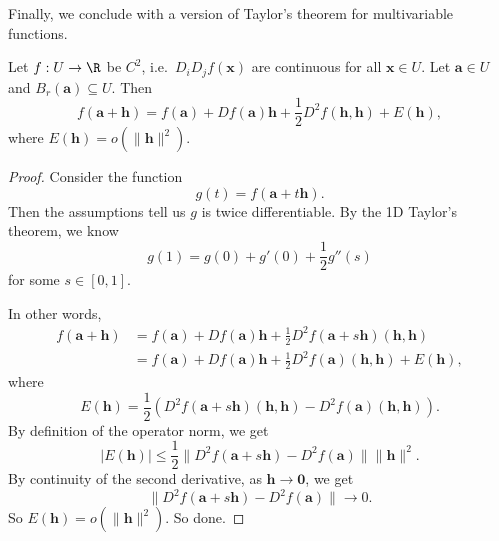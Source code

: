 \documentclass[a4paper]{article}
\begin{document}
Finally, we conclude with a version of Taylor's theorem for multivariable functions.

\begin{thm}
  Let $f: U \to \R$ be $C^2$, i.e.\ $D_i D_j f(\mathbf{x})$ are continuous for all $\mathbf{x} \in U$. Let $\mathbf{a} \in U$ and $B_r(\mathbf{a}) \subseteq U$. Then
  \[
    f(\mathbf{a} + \mathbf{h}) = f(\mathbf{a}) + D f(\mathbf{a})\mathbf{h} + \frac{1}{2} D^2 f(\mathbf{h}, \mathbf{h}) + E(\mathbf{h}),
  \]
  where $E(\mathbf{h}) = o(\|\mathbf{h}\|^2)$.
\end{thm}

\begin{proof}
  Consider the function
  \[
    g(t) = f(\mathbf{a} + t\mathbf{h}).
  \]
  Then the assumptions tell us $g$ is twice differentiable. By the 1D Taylor's theorem, we know
  \[
    g(1) = g(0) + g'(0) + \frac{1}{2} g''(s)
  \]
  for some $s \in [0, 1]$.

  In other words,
  \begin{align*}
    f(\mathbf{a} + \mathbf{h}) &= f(\mathbf{a}) + Df(\mathbf{a}) \mathbf{h} + \frac{1}{2} D^2 f(\mathbf{a} + s \mathbf{h}) (\mathbf{h}, \mathbf{h})\\
    &= f(\mathbf{a}) + Df(\mathbf{a}) \mathbf{h} + \frac{1}{2} D^2 f(\mathbf{a}) (\mathbf{h}, \mathbf{h}) + E(\mathbf{h}),
  \end{align*}
  where
  \[
    E(\mathbf{h}) = \frac{1}{2}\left(D^2 f(\mathbf{a} + s \mathbf{h}) (\mathbf{h}, \mathbf{h}) - D^2 f(\mathbf{a}) (\mathbf{h}, \mathbf{h})\right).
  \]
  By definition of the operator norm, we get
  \[
    |E(\mathbf{h})| \leq \frac{1}{2} \|D^2 f(\mathbf{a} + s \mathbf{h}) - D^2 f(\mathbf{a})\| \|\mathbf{h}\|^2.
  \]
  By continuity of the second derivative, as $\mathbf{h} \to \mathbf{0}$, we get
  \[
    \|D^2 f(\mathbf{a} + s \mathbf{h}) - D^2 f(\mathbf{a})\| \to 0.
  \]
  So $E(\mathbf{h}) = o(\|\mathbf{h}\|^2)$. So done.
\end{proof}
\end{document}
